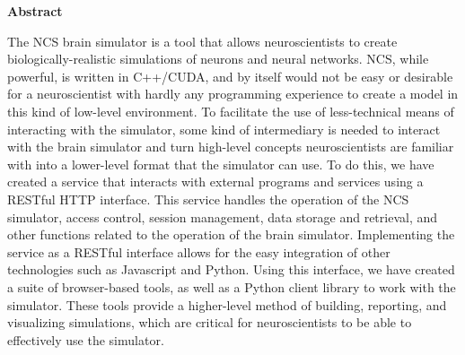 \newpage
{}
\begin{center}
  {\bf Abstract}
\end{center}

The NCS brain simulator is a tool that allows neuroscientists to create biologically-realistic simulations of neurons and neural networks. NCS, while powerful, is written in C++/CUDA, and by itself would not be easy or desirable for a neuroscientist with hardly any programming experience to create a model in this kind of low-level environment. To facilitate the use of less-technical means of interacting with the simulator, some kind of intermediary is needed to interact with the brain simulator and turn high-level concepts neuroscientists are familiar with into a lower-level format that the simulator can use. To do this, we have created a service that interacts with external programs and services using a RESTful HTTP interface. This service handles the operation of the NCS simulator, access control, session management, data storage and retrieval, and other functions related to the operation of the brain simulator. Implementing the service as a RESTful interface allows for the easy integration of other technologies such as Javascript and Python. Using this interface, we have created a suite of browser-based tools, as well as a Python client library to work with the simulator. These tools provide a higher-level method of building, reporting, and visualizing simulations, which are critical for neuroscientists to be able to effectively use the simulator.